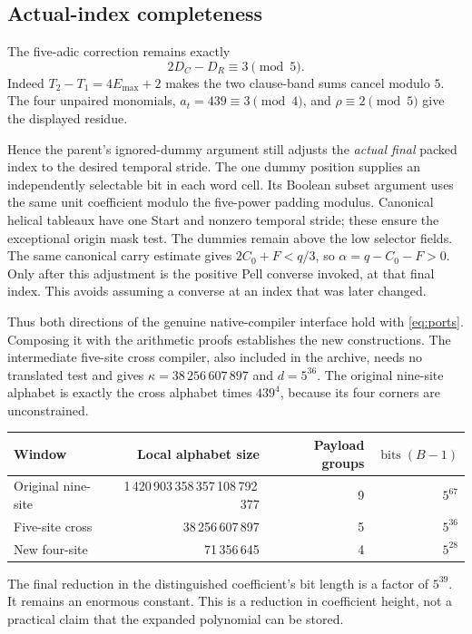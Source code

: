 \documentclass[11pt,a4paper]{article}
\theoremstyle{remark}\newtheorem{remark}[theorem]{Remark}
\newcommand{\bits}{\operatorname{bits}}
\begin{document}
\subsection{Actual-index completeness}

The five-adic correction remains exactly
\[
 2D_C-D_R\equiv3\pmod5.
\]
Indeed $T_2-T_1=4E_{\max}+2$ makes the two clause-band sums cancel
modulo $5$. The four unpaired monomials, $a_t=439\equiv3\pmod4$,
and $\rho\equiv2\pmod5$ give the displayed residue.

Hence the parent's ignored-dummy argument still adjusts the
\emph{actual final} packed index to the desired temporal stride.
The one dummy position supplies an independently selectable bit in
each word cell. Its Boolean subset argument uses the same unit
coefficient modulo the five-power padding modulus. Canonical
helical tableaux have one Start and nonzero temporal stride; these
ensure the exceptional origin mask test. The dummies remain above
the low selector fields. The same canonical carry estimate gives
$2C_0+F<q/3$, so $\alpha=q-C_0-F>0$.
Only after this adjustment is the positive Pell converse invoked,
at that final index. This avoids assuming a converse at an index
that was later changed.

Thus both directions of the genuine native-compiler interface hold
with \eqref{eq:ports}. Composing it with the arithmetic proofs
establishes the new constructions. The intermediate five-site
cross compiler, also included in the archive, needs no translated
test and gives $\kappa=38\,256\,607\,897$ and $d=5^{36}$.
The original nine-site alphabet is exactly the cross alphabet
times $439^4$, because its four corners are unconstrained.
\begin{center}\small
\begin{tabular}{lrrr}
\toprule
Window & Local alphabet size & Payload groups & $\bits(B-1)$\\
\midrule
Original nine-site &1\,420\,903\,358\,357\,108\,792\,377&9&$5^{67}$\\
Five-site cross &38\,256\,607\,897&5&$5^{36}$\\
New four-site &71\,356\,645&4&$5^{28}$\\
\bottomrule
\end{tabular}
\end{center}
The final reduction in the distinguished coefficient's bit length
is a factor of $5^{39}$. It remains an enormous constant. This is
a reduction in coefficient height, not a practical claim that the
expanded polynomial can be stored.
\end{document}
